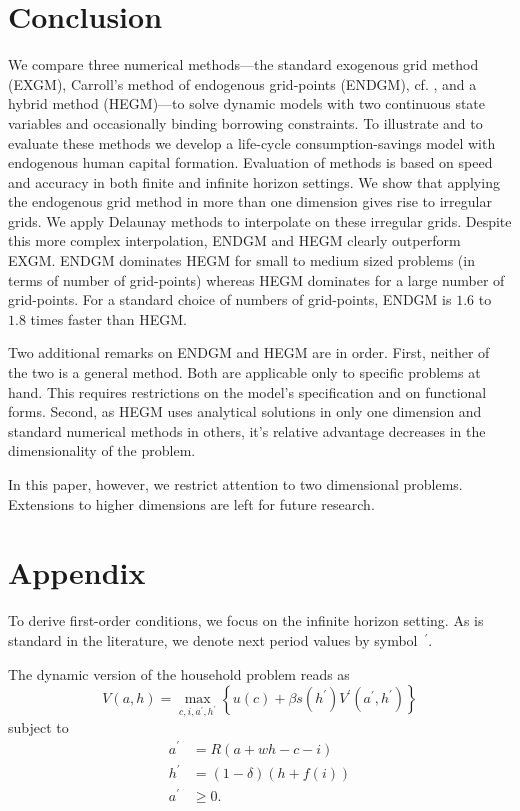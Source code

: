 \documentclass[a4paper,12pt]{article}%
\begin{document}
\clearpage

\section{Conclusion}

We compare three numerical methods---the standard exogenous grid method (EXGM), Carroll's method of endogenous grid-points (ENDGM), cf. , and a hybrid method (HEGM)---to solve dynamic models with two continuous
state variables and occasionally binding borrowing constraints. To illustrate and to evaluate these methods we develop a life-cycle consumption-savings model with endogenous human capital formation. Evaluation of methods is based on speed and accuracy in both finite and infinite horizon settings. We show that applying the endogenous grid method in more than one dimension gives rise to irregular grids. We apply Delaunay methods to interpolate on these irregular grids. Despite this more complex interpolation, ENDGM and HEGM  clearly outperform EXGM. ENDGM dominates HEGM for small to medium sized problems (in terms of number of grid-points) whereas HEGM dominates for a large number of grid-points. For a standard choice of numbers of grid-points, ENDGM is $1.6$ to~$1.8$ times faster than HEGM.

Two additional remarks on ENDGM and HEGM are in order. First, neither of the two is a general method. Both are applicable only to specific problems at hand. This requires restrictions on the model's specification and on functional forms. Second, as HEGM uses analytical solutions in only one dimension and standard numerical methods in others, it's relative advantage decreases in the dimensionality of the problem.

In this paper, however, we restrict attention to two dimensional problems. Extensions to higher dimensions are left for future research.

\clearpage\newpage

\section{Appendix}

\label{app:equations}

To derive first-order conditions, we focus on the infinite horizon setting. As is standard in the literature, we denote next period values by symbol~$^{\prime}$.

The dynamic version of the household problem reads as
\[
V(a,h)=\underset{c,i,a^{\prime},h^{\prime}}{\max}\left\{  u(c)+\beta s\left(h^{\prime}\right)  V^{\prime}(a^{\prime},h^{\prime})\right\}
\]
subject to
\begin{align*}
a^{\prime}  &  =R\left(  a+wh-c-i\right) \\
h^{\prime}  &  =\left(  1-\delta\right)  \left(  h+f\left(  i\right)  \right) \\
a^{\prime}  &  \geq0.
\end{align*}
\end{document}
